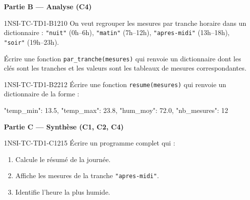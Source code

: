 \textbf{Partie B --- Analyse (C4)}

\begin{exercice}{1NSI-TC-TD1-B1}{2}{10}
On veut regrouper les mesures par tranche horaire dans un dictionnaire :
\lstinline{"nuit"} (0h--6h), \lstinline{"matin"} (7h--12h),
\lstinline{"apres-midi"} (13h--18h), \lstinline{"soir"} (19h--23h).

Écrire une fonction \lstinline{par_tranche(mesures)} qui renvoie un
dictionnaire dont les clés sont les tranches et les valeurs sont les
tableaux de mesures correspondantes.
\end{exercice}

\begin{exercice}{1NSI-TC-TD1-B2}{2}{12}
Écrire une fonction \lstinline{resume(mesures)} qui renvoie un dictionnaire
de la forme :
\begin{python}
{"temp_min": 13.5, "temp_max": 23.8,
 "hum_moy": 72.0, "nb_mesures": 12}
\end{python}
\end{exercice}


\textbf{Partie C --- Synthèse (C1, C2, C4)}

\begin{exercice}{1NSI-TC-TD1-C1}{2}{15}
Écrire un programme complet qui :
\begin{enumerate}
  \item Calcule le résumé de la journée.
  \item Affiche les mesures de la tranche \lstinline{"apres-midi"}.
  \item Identifie l'heure la plus humide.
\end{enumerate}
\end{exercice}
